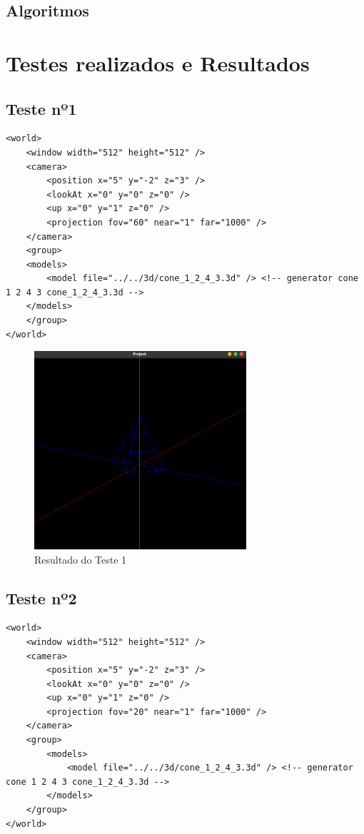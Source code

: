 \documentclass[11pt,a4paper]{report}%
\begin{document}
\section{Algoritmos}

\chapter{Testes realizados e Resultados}
\section{Teste nº1}

\begin{lstlisting}[caption={XML do Teste 1}, label={teste1}]
<world> 
    <window width="512" height="512" />
    <camera> 
	    <position x="5" y="-2" z="3" />
	    <lookAt x="0" y="0" z="0" />
	    <up x="0" y="1" z="0" />
        <projection fov="60" near="1" far="1000" /> 
    </camera>
    <group> 
  	<models> 
		<model file="../../3d/cone_1_2_4_3.3d" /> <!-- generator cone 1 2 4 3 cone_1_2_4_3.3d -->
 	</models>
    </group>
</world>
\end{lstlisting}

\begin{figure}[H]
	\centering
	\includegraphics[width=0.7\textwidth]{images/cone.png}
	\caption{Resultado do Teste 1} \label{fig:cone}
\end{figure}

\newpage
\section{Teste nº2}
\begin{lstlisting}[caption={XML do Teste 2}, label={teste2}]
<world> 
    <window width="512" height="512" />
    <camera> 
        <position x="5" y="-2" z="3" />
        <lookAt x="0" y="0" z="0" />
        <up x="0" y="1" z="0" />
        <projection fov="20" near="1" far="1000" /> 
    </camera>
    <group> 
        <models> 
            <model file="../../3d/cone_1_2_4_3.3d" /> <!-- generator cone 1 2 4 3 cone_1_2_4_3.3d -->
        </models>
    </group>
</world>
\end{lstlisting}
\end{document}

